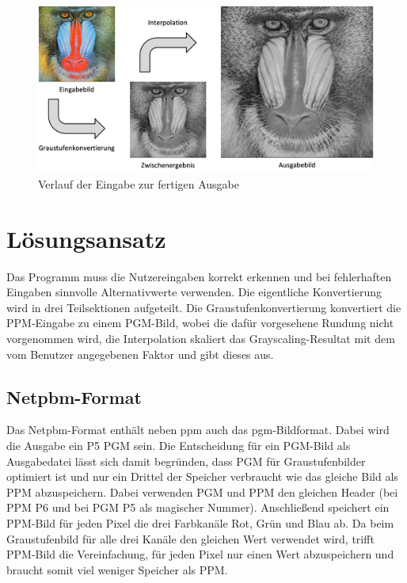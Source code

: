 \documentclass[course=erap]{aspdoc}
\begin{document}
\begin{figure}[h]
    \centering
    \includegraphics[scale=0.8]{Ausarbeitung/assets/verlauf.png}
    \caption{Verlauf der Eingabe zur fertigen Ausgabe}
    \label{fig:verlauf}
\end{figure}

\section{Lösungsansatz}
Das Programm muss die Nutzereingaben korrekt erkennen und bei fehlerhaften Eingaben sinnvolle Alternativwerte verwenden.
Die eigentliche Konvertierung wird in drei Teilsektionen aufgeteilt. Die Graustufenkonvertierung konvertiert die PPM-Eingabe zu einem PGM-Bild, wobei die dafür vorgesehene Rundung nicht vorgenommen wird, die Interpolation skaliert das Grayscaling-Resultat mit dem vom Benutzer angegebenen Faktor und gibt dieses aus.

\subsection{Netpbm-Format}
Das Netpbm-Format enthält neben ppm auch das pgm-Bildformat. Dabei wird die Ausgabe ein P5 PGM sein. Die Entscheidung für ein PGM-Bild als Ausgabedatei lässt sich damit begründen, dass PGM für Graustufenbilder optimiert ist und nur ein Drittel der Speicher verbraucht wie das gleiche Bild als PPM abzuspeichern. Dabei verwenden PGM und PPM den gleichen Header (bei PPM P6 und bei PGM P5 als magischer Nummer). Anschließend speichert ein PPM-Bild für jeden Pixel die drei Farbkanäle Rot, Grün und Blau ab. Da beim Graustufenbild für alle drei Kanäle den gleichen Wert verwendet wird, trifft PPM-Bild die Vereinfachung, für jeden Pixel nur einen Wert abzuspeichern und braucht somit viel weniger Speicher als PPM.
\end{document}
